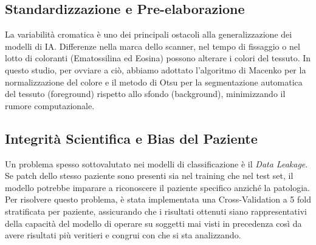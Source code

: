 \subsection{Standardizzazione e Pre-elaborazione} La variabilità cromatica è uno dei principali ostacoli alla generalizzazione dei modelli di IA. Differenze nella marca dello scanner, nel tempo di fissaggio o nel lotto di coloranti (Ematossilina ed Eosina) possono alterare i colori del tessuto. In questo studio, per ovviare a ciò, abbiamo adottato l'algoritmo di Macenko per la normalizzazione del colore e il metodo di Otsu per la segmentazione automatica del tessuto (foreground) rispetto allo sfondo (background), minimizzando il rumore computazionale.

\subsection{Integrità Scientifica e Bias del Paziente} Un problema spesso sottovalutato nei modelli di classificazione è il \textit{Data Leakage}. Se patch dello stesso paziente sono presenti sia nel training che nel test set, il modello potrebbe imparare a riconoscere il paziente specifico anziché la patologia. Per risolvere questo problema, è stata implementata una Cross-Validation a 5 fold stratificata per paziente, assicurando che i risultati ottenuti siano rappresentativi della capacità del modello di operare su soggetti mai visti in precedenza così da avere risultati più veritieri e congrui con che si sta analizzando.